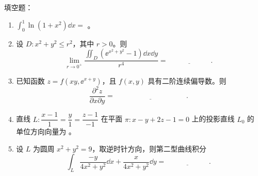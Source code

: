 
填空题：
\begin{enumerate}[label=(\arabic*)]
  \item $\displaystyle\int_0^1 \ln(1+x^2)\dd x=$ \underline{\hspace{6em}}。
  \item 设 $D: x^2+y^2\le r^2$，其中 $r>0$。则
  \[ \lim_{r\to 0^+}\frac{\iint_D (\ee^{x^2+y^2}-1)\dd x\dd y}{r^4}=\underline{\hspace{6em}}. \]
  \item 已知函数 $z=f(xy,\ee^{x+y})$，且 $f(x,y)$ 具有二阶连续偏导数。则
  \[ \frac{\partial^2 z}{\partial x\partial y}=\underline{\hspace{10em}}. \]
  \item 直线 $L:\dfrac{x-1}{1}=\dfrac{y}{1}=\dfrac{z-1}{-1}$ 在平面 $\pi: x-y+2z-1=0$ 上的投影直线 $L_0$ 的单位方向向量为 \underline{\hspace{6em}}。
  \item 设 $L$ 为圆周 $x^2+y^2=9$，取逆时针方向，则第二型曲线积分
  \[ \int_L \frac{-y}{4x^2+y^2}\dd x+\frac{x}{4x^2+y^2}\dd y=\underline{\hspace{6em}}. \]
\end{enumerate}
